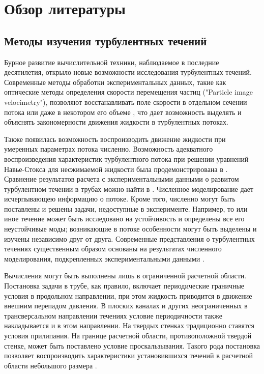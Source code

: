 \section{Обзор литературы}

	
	\subsection{Методы изучения турбулентных течений}

Бурное развитие вычислительной техники, наблюдаемое в последние десятилетия, открыло новые возможности исследования турбулентных течений. Современные методы обработки экспериментальных данных, такие как оптические методы определения скорости перемещения частиц ("Particle image velocimetry"), позволяют восстанавливать поле скорости в отдельном сечении потока или даже в некотором его объеме \cite{PIVbook}, что дает возможность выделять и объяснять закономерности движения жидкости в турбулентных потоках. 

Также появилась возможность воспроизводить движение жидкости при умеренных параметрах потока численно. Возможность адекватного воспроизведения характеристик турбулентного потока при решении уравнений Навье-Стокса для несжимаемой жидкости была продемонстрирована в \cite{Kim1987}. Сравнение результатов расчета с экспериментальными данными о развитом турбулентном течении в трубах можно найти в \cite{Priymak1998, Nikitin2006}. Численное моделирование дает исчерпывающею информацию о потоке. Кроме того, численно могут быть поставлены и решены задачи, недоступные в эксперименте. Например, то или иное течение может быть исследовано на устойчивость и определены все его неустойчивые моды; возникающие в потоке особенности могут быть выделены и изучены независимо друг от друга. Современные представления о турбулентных течениях существенным образом основаны на результатах численного моделирования, подкрепленных экспериментальными данными \cite{Manneville2015, Manneville2016}.

Вычисления могут быть выполнены лишь в ограниченной расчетной области. Постановка задачи в трубе, как правило, включает периодические граничные условия в продольном направлении, при этом жидкость приводится в движение внешним перепадом давления. В плоских каналах и других неограниченных в трансверсальном направлении течениях условие периодичности также накладывается и в этом направлении. На твердых стенках традиционно ставятся условия прилипания. На границе расчетной области, противоположной твердой стенке, может быть поставлено условие проскальзывания. Такого рода постановка позволяет воспроизводить характеристики установившихся течений в расчетной области небольшого размера \cite{Kim1987, Priymak1998, Nikitin2006}. 


